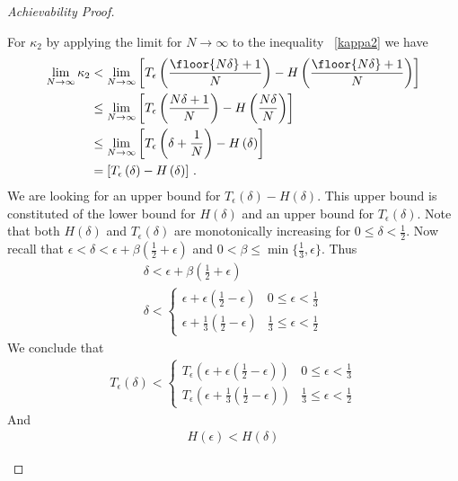 \begin{proof}[Achievability Proof]
\begin{itemize}
\begin{enumerate}
For $\kappa_2$ by applying the limit for $N \to \infty$ to the inequality ~\eqref{kappa2} we have 
\begin{align}
\label{as.kappa2}
     \lim_{N\to\infty} \kappa_2 &< \lim_{N\to\infty} \left[T_\epsilon\left(\frac{\floor{N\delta}+1}{N}\right)-H\left(\frac{\floor{N\delta}+1}{N}\right)\right]
     \nonumber\\
     &\leq \lim_{N\to\infty} \left[T_\epsilon\left(\frac{N\delta+1}{N}\right)-H\left(\frac{N\delta}{N}\right)\right]
      \nonumber\\
     &\leq \lim_{N\to\infty} \left[T_\epsilon\left(\delta+\frac{1}{N}\right)-H\left(\delta\right)\right]
      \nonumber\\
     &= \left[T_\epsilon\left(\delta \right)-H\left(\delta \right)\right] \,.\,
\end{align}
 We are looking for an upper bound for $T_\epsilon\left(\delta \right)-H\left(\delta \right)$. This upper bound is constituted of the lower bound for $H\left(\delta \right)$ and an upper bound for $T_\epsilon\left(\delta \right)$.
Note that both $H\left(\delta \right)$ and  $T_\epsilon\left(\delta \right)$ are monotonically increasing for $0\leq \delta < \frac{1}{2}$.
Now recall that $\epsilon<\delta<\epsilon + \beta(\frac{1}{2}+\epsilon)$ and $0<\beta \leq \min\{ \frac{1}{3} , \epsilon \}$. Thus
\begin{align}
    \delta<\epsilon + \beta(\frac{1}{2}+\epsilon)
    \nonumber
    \\
    \delta <
    \begin{cases}
    \epsilon + \epsilon(\frac{1}{2} - \epsilon)  & 0 \leq \epsilon < \frac{1}{3}
    \\
    \epsilon + \frac{1}{3}(\frac{1}{2} - \epsilon) & \frac{1}{3} \leq \epsilon < \frac{1}{2}
    \end{cases}
\end{align}
We conclude that 
\begin{align}
   T_\epsilon\left(\delta \right) <   \begin{cases}
    T_\epsilon\left(\epsilon + \epsilon(\frac{1}{2} - \epsilon) \right)  & 0 \leq \epsilon < \frac{1}{3}
    \\
    T_\epsilon\left(\epsilon + \frac{1}{3}(\frac{1}{2} - \epsilon) \right)
     & \frac{1}{3} \leq \epsilon < \frac{1}{2}
    \end{cases}
\end{align}
And 
\begin{align}
    H(\epsilon) < H(\delta)
\end{align}

\end{enumerate}
\end{itemize}
\end{proof}
